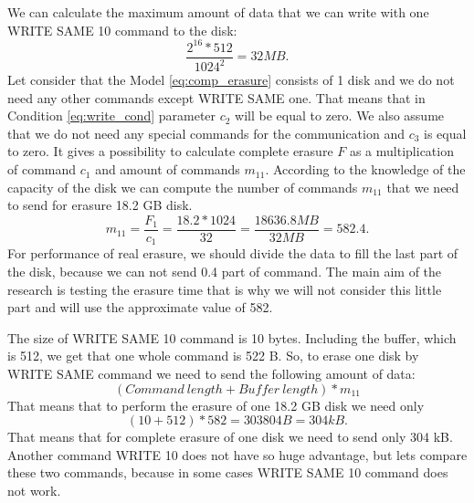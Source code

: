 We can calculate the maximum amount of data that we can write with one WRITE SAME 10 command to the disk:
\begin{equation}
	\frac{2^{16}*512}{1024^2} = 32 MB.
\end{equation}
Let consider that the Model \ref{eq:comp_erasure} consists of 1 disk and we do not need any other commands except WRITE SAME one. That means that in Condition \ref{eq:write_cond} parameter $c_2$ will be equal to zero. We also assume that we do not need any special commands for the communication and $c_3$ is equal to zero. It gives a possibility to calculate complete erasure $F$ as a multiplication of command $c_1$ and amount of commands $m_{11}$. According to the knowledge of the capacity of the disk we can compute the number of commands $m_{11}$ that we need to send for erasure 18.2 GB disk.
\begin{equation}
	m_{11} =\frac{F_1}{c_1} = \frac{18.2*1024}{32} = \frac{18636.8MB}{32MB} = 582.4.
\end{equation}
For performance of real erasure, we should divide the data to fill the last part of the disk, because we can not send 0.4 part of command. The main aim of the research is testing the erasure time that is why we will not consider this little part and will use the approximate value of 582.

The size of WRITE SAME 10 command is 10 bytes. Including the buffer, which is 512, we get that one whole command is 522 B.
So, to erase one disk by WRITE SAME command we need to send the following amount of data:\begin{equation}
	(Command~length + Buffer~length)*m_{11}
\end{equation}
That means that to perform the erasure of one 18.2 GB disk we need only
\begin{equation}
	(10 + 512)*582 = 303804 B = 304 kB.
\end{equation}
That means that for complete erasure of one disk we need to send only 304 kB. Another command WRITE 10 does not have so huge advantage, but lets compare these two commands, because in some cases WRITE SAME 10 command does not work.


